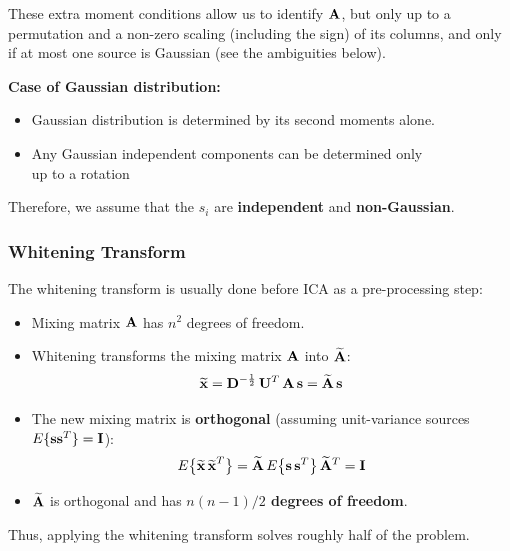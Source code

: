   These extra moment conditions allow us to identify $\mathbf{A}$, but only up to a permutation and a non-zero scaling (including the sign) of its columns, and only if at most one source is Gaussian (see the ambiguities below). 

 \textbf {Case of Gaussian distribution:}
  
  \begin{itemize}
    \item Gaussian distribution is determined by its second moments alone.
    \item Any Gaussian independent components can be determined only \\
      up to a rotation
  \end{itemize}
  \vspace{0.5\baselineskip}

  Therefore, we assume that the $s_i$ are \textbf{independent} and \textbf{non-Gaussian}.

\subsubsection{Whitening Transform}

  The whitening transform is usually done before ICA as a pre-processing step:

  \begin{itemize}
    \item Mixing matrix $\mathbf{A}$ has $n^2$ degrees of freedom.
    \item Whitening transforms the mixing matrix $\mathbf{A}$ into $\mathbf{\widetilde A}$:
      \begin{displaymath}
        \widetilde{\bm{\mathrm{x}}} = \mathbf{D}^{-\frac{1}{2}} \, \mathbf{U}^T \, \mathbf{A} \, \bm{\mathrm{s}} = \mathbf{\widetilde A}\, \bm{\mathrm{s}}
      \end{displaymath}
    \item The new mixing matrix is \textbf{orthogonal} (assuming unit-variance sources $E\{\bm{\mathrm{s}}\bm{\mathrm{s}}^T\}=\mathbf{I}$):
      \begin{displaymath}
        E\big\{ \widetilde{\bm{\mathrm{x}}}\,\widetilde{\bm{\mathrm{x}}}^T \big\} = \mathbf{\widetilde A}\, E\big\{\bm{\mathrm{s}}\, \bm{\mathrm{s}}^T\big\} \, \mathbf{\widetilde A}^T = \mathbf{I}
      \end{displaymath}
    \item $\mathbf{\widetilde A}$ is orthogonal and has \textbf{$n (n-1) / 2$ degrees of freedom}.
  \end{itemize}

  Thus, applying the whitening transform solves roughly half of the problem.

